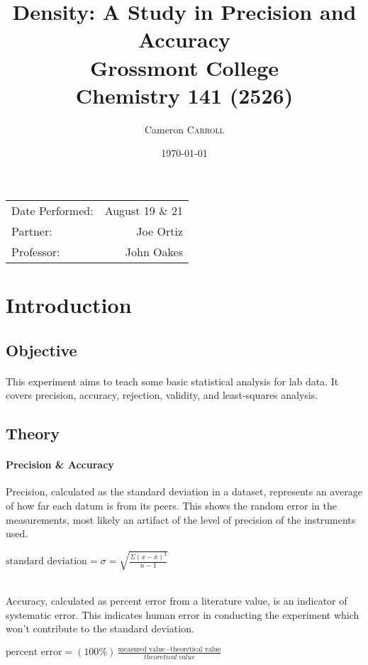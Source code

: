 \documentclass{article}
\title{Density: A Study in Precision and Accuracy \\ Grossmont College \\ Chemistry 141 (2526)} %
\author{Cameron \textsc{Carroll}}
\date{\today}
\begin{document}
\maketitle

\begin{center}
\begin{tabular}{l r}
Date Performed: & August 19 \& 21 \\
Partner: & Joe Ortiz \\
Professor: & John Oakes
\end{tabular}
\end{center}

\newpage



\section{Introduction}
\subsection{Objective}
  \paragraph{}
    This experiment aims to teach some basic statistical analysis for lab
    data.   It covers precision, accuracy, rejection, validity, and
    least-squares analysis.
\subsection{Theory}
  \paragraph{Precision \& Accuracy}
    Precision, calculated as the standard deviation in a dataset,
    represents an average of how far each datum is from its peers.
    This shows the random error in the measurements, most likely an
    artifact of the level of precision of the instruments used. \\
    \begin{center}$\text{standard deviation} = \sigma = 
    \sqrt{\frac{\Sigma (x-\bar{x})^2}{n-1}}$\end{center}
    \mbox{}\\
    Accuracy, calculated as percent error from a literature value,
    is an indicator of systematic error. This indicates human error
    in conducting the experiment which won't contribute to the
    standard deviation. \\
    \begin{center}$\text{percent error} = (100\%)
    \frac{\text{measured\ value} - \text{theoretical\ value}}{theoretical\ value}$\end{center}
\end{document}

